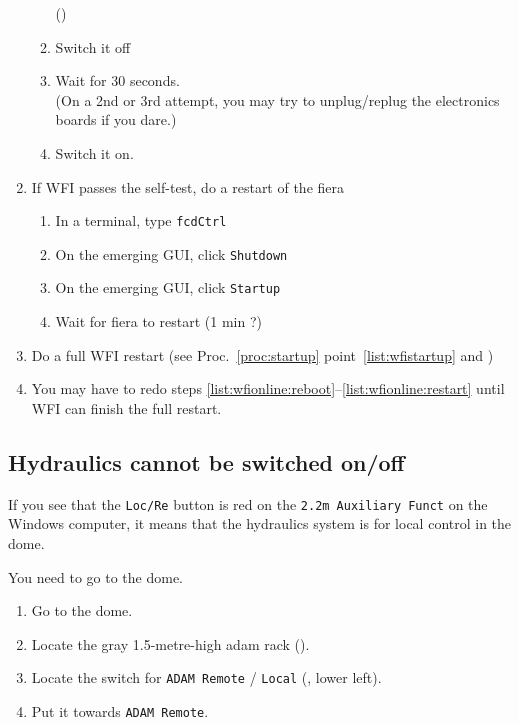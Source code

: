 \documentclass[11pt,fleqn,a4paper]{book}
\begin{document}
\begin{enumerate}
\begin{enumerate}
			()
		\item Switch it off
                \item Wait for 30 seconds.\\
                      (On a 2nd or 3rd attempt, you may try to unplug/replug the electronics boards if you dare.)
		\item Switch it on.
	\end{enumerate}
  \item  If WFI passes the self-test, do a restart of the \gls{fiera} 
        \begin{enumerate}
		\item In a terminal, type \texttt{fcdCtrl}
                \item On the emerging GUI, click \texttt{Shutdown}
                \item On the emerging GUI, click \texttt{Startup}
		\item Wait for \gls{fiera} to restart (1 min ?)
        \end{enumerate}
  \item\label{list:wfionline:restart} Do a full WFI restart (see Proc.~\ref{proc:startup} point~\ref{list:wfistartup} and )
  \item You may have to redo steps \ref{list:wfionline:reboot}--\ref{list:wfionline:restart} until WFI can finish the full restart.
\end{enumerate}


\subsection{Hydraulics cannot be switched on/off}
\label{sec:hydr-loc}
If you see that the \texttt{Loc/Re} button is red on the \texttt{2.2m Auxiliary Funct} on the Windows computer, it means that the hydraulics system is for local control in the dome.

You need to go to the dome.

\begin{enumerate}
   \item Go to the dome.
   \item Locate the gray 1.5-metre-high \gls{adam} rack ().
   \item Locate the switch for \texttt{ADAM Remote} / \texttt{Local} (, lower left).
   \item Put it towards \texttt{ADAM Remote}.
\end{enumerate}
\end{document}
